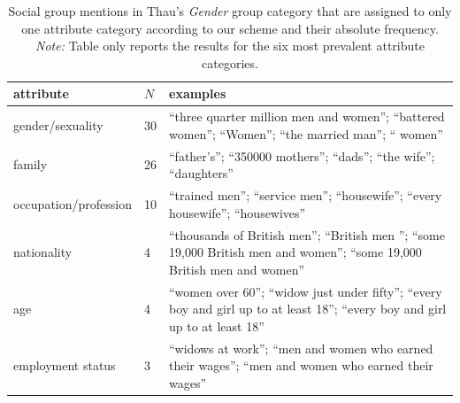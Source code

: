 \begin{table}[!th]
\centering
\caption{Social group mentions in Thau's \emph{Gender} group category that are assigned to only one attribute category according to our scheme and their absolute frequency. \emph{Note:} Table only reports the results for the six most prevalent attribute categories.}
\label{tableC08}
\begin{tabular}{p{2.2in} l L{3in}}
\toprule
attribute & $N$ & examples \\
\midrule
gender/sexuality & 30 & ``three quarter million men and women''; ``battered women''; ``Women''; ``the married man''; `` women'' \\
family & 26 & ``father’s''; ``350000 mothers''; ``dads''; ``the wife''; ``daughters'' \\
occupation/profession & 10 & ``trained men''; ``service men''; ``housewife''; ``every housewife''; ``housewives'' \\
nationality & 4 & ``thousands of British men''; ``British men ''; ``some 19,000 British men and women''; ``some 19,000 British men and women'' \\
age & 4 & ``women over 60''; ``widow just under fifty''; ``every boy and girl up to at least 18''; ``every boy and girl up to at least 18'' \\
employment status & 3 & ``widows at work''; ``men and women who earned their wages''; ``men and women who earned their wages'' \\
\bottomrule
\end{tabular}
\end{table}
